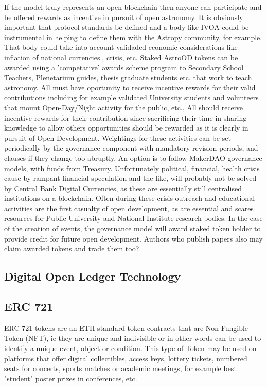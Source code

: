 \documentclass[final,5p,times,twocolumn,authoryear]{elsarticle}
\begin{document}
If the  model truly represents an open blockchain then anyone can participate and be offered rewards as incentive in pursuit of open astronomy. It is obviously important that protocol standards be defined and a body like IVOA could be instrumental in helping to define them with the Astropy community, for example. That body could take into account validaded economic considerations like inflation of national currencies., crisis, etc. Staked AstroOD tokens can be awarded using a 'competative' awards scheme program to Secondary School Teachers, Plenetarium guides, thesis graduate students etc. that work to teach astronomy. All must have oportunity to receive incentive rewards for their valid contributions including for example validated University students and volunteers that mount Open-Day/Night activity for the public, etc., All should receive incentive rewards for their contribution since sacrificing their time in sharing knowledge to allow others opportunities should be rewarded as it is clearly in pursuit of Open Development. Weightings for these activities can be set periodically by the governance component with mandatory revision periods, and clauses if they change too abruptly. An option is to follow MakerDAO governance models, with funds from Treasury. Unfortunately political, financial, health  crisis cause by rampant financial speculation and the like, will probably not be solved by Central Bank Digital Currencies, as these are essentially still centralised institutions on a blockchain.  Often during these crisis outreach and educational activities are the first casualty of open development, as are essential and scares resources for Public University and National Institute research bodies. In the case of the creation of events, the governance model will award staked token holder to provide credit for future open development. Authors who publish papers also may claim awarded tokens and trade them too?

\subsection{Digital Open Ledger Technology}

\subsection{ERC 721 }

ERC 721 tokens are an ETH standard token contracts that are Non-Fungible Token (NFT), ie they are unique and indivisible or in other words can be used to identify a unique event, object or condition. This type of Token may be used on platforms that offer digital collectibles, access keys, lottery tickets, numbered seats for concerts, sports matches or academic meetings, for example best "student" poster prizes in conferences, etc. 
\end{document}

